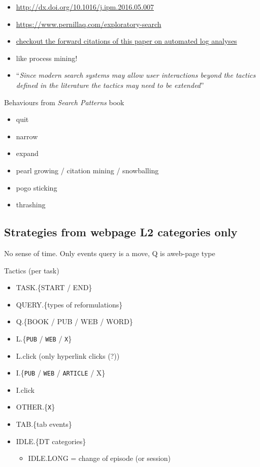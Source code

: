 \documentclass[letterpaper, nobind]{templates/ociamthesis}
\providecommand{\tightlist}{%
  \setlength{\itemsep}{0pt}\setlength{\parskip}{0pt}}
\begin{document}
\begin{itemize}
\tightlist
\item
  \url{http://dx.doi.org/10.1016/j.ipm.2016.05.007}
\item
  \url{https://www.pernillaq.com/exploratory-search}
\item
  \href{https://scholar.google.com/scholar?cites=16001618163231710088\&as_sdt=5,44\&sciodt=0,44\&hl=en}{checkout the forward citations of this paper on automated log analyses}
\item
  like process mining!
\item
  ``\emph{Since modern search systems may allow user interactions beyond the tactics defined in the literature the tactics may need to be extended}''
\end{itemize}

Behaviours from \emph{Search Patterns} book

\begin{itemize}
\tightlist
\item
  quit
\item
  narrow
\item
  expand
\item
  pearl growing / citation mining / snowballing
\item
  pogo sticking
\item
  thrashing
\end{itemize}

\hypertarget{strategies-from-webpage-l2-categories-only}{%
\subsection{Strategies from webpage L2 categories only}\label{strategies-from-webpage-l2-categories-only}}

No sense of time. Only events
query is a move, Q is aweb-page type

Tactics (per task)

\begin{itemize}
\tightlist
\item
  TASK.\{START / END\}
\item
  QUERY.\{types of reformulations\}
\item
  Q.\{BOOK / PUB / WEB / WORD\}
\item
  L.\{\texttt{PUB} / \texttt{WEB} / \texttt{X}\}
\item
  L.click (only hyperlink clicks (?))
\item
  I.\{\texttt{PUB} / \texttt{WEB} / \texttt{ARTICLE} / X\}
\item
  I.click
\item
  OTHER.\{\texttt{X}\}
\item
  TAB.\{tab events\}
\item
  IDLE.\{DT categories\}

  \begin{itemize}
  \tightlist
  \item
    IDLE.LONG = change of episode (or session)
  \end{itemize}
\end{itemize}
\end{document}
